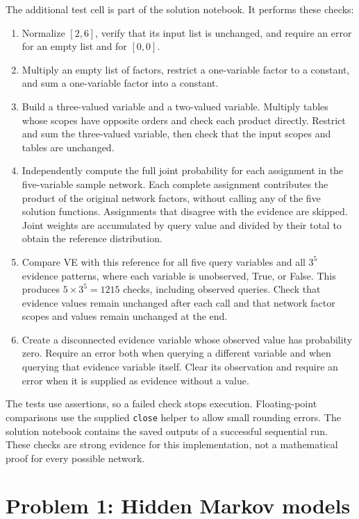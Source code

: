 \documentclass[11pt,a4paper]{article}
\begin{document}
The additional test cell is part of the solution notebook. It performs these checks:
\begin{enumerate}
\item Normalize \([2,6]\), verify that its input list is unchanged, and require
an error for an empty list and for \([0,0]\).
\item Multiply an empty list of factors, restrict a one-variable factor to a
constant, and sum a one-variable factor into a constant.
\item Build a three-valued variable and a two-valued variable. Multiply tables
whose scopes have opposite orders and check each product directly. Restrict and
sum the three-valued variable, then check that the input scopes and tables are unchanged.
\item Independently compute the full joint probability for each assignment in the
five-variable sample network. Each complete assignment contributes the product of
the original network factors, without calling any of the five solution functions.
Assignments that disagree with the evidence are skipped. Joint weights are accumulated
by query value and divided by their total to obtain the reference distribution.
\item Compare VE with this reference for all five query variables and all
\(3^5\) evidence patterns, where each variable is unobserved, True, or False.
This produces \(5\times3^5=1215\) checks, including observed queries.
Check that evidence values remain unchanged after each call and that network
factor scopes and values remain unchanged at the end.
\item Create a disconnected evidence variable whose observed value has probability
zero. Require an error both when querying a different variable and when querying
that evidence variable itself. Clear its observation and require an error when
it is supplied as evidence without a value.
\end{enumerate}
The tests use assertions, so a failed check stops execution. Floating-point
comparisons use the supplied \texttt{close} helper to allow small rounding errors.
The solution notebook contains the saved outputs of a successful sequential run.
These checks are strong evidence for this implementation, not a mathematical proof
for every possible network.

\newpage
\section{Problem 1: Hidden Markov models}
\end{document}
